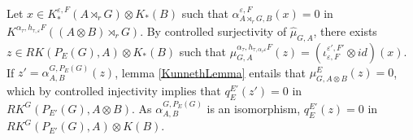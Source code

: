 \begin{dem}
Let $x\in K^{\varepsilon,F}_*(A\rtimes_r G)\otimes K_*(B)$ such that $\alpha_{A\rtimes_r G,B}^{\varepsilon,F}(x)=0$ in $K^{\alpha_\tau,h_{\tau,\varepsilon} F}((A\otimes B)\rtimes_r G)$. By controlled surjectivity of $\hat\mu_{G,A}$, there exists $z\in RK(P_E(G),A)\otimes K_*(B)$ such that $\mu_{G,A}^{\alpha_\tau,h_{\tau,\alpha_\tau\varepsilon} F}(z)=(\iota_{\varepsilon,F}^{\varepsilon',F'}\otimes id) (x)$. If $z' = \alpha_{A,B}^{G,P_E(G)}(z)$, lemma \ref{KunnethLemma} entails that $\mu^{E}_{G,A\otimes B}(z)=0$, which by controlled injectivity implies that $q_E^{E'}(z')=0$ in $RK^G(P_{E'}(G),A\otimes B)$. As $\alpha_{A,B}^{G,P_E(G)}$ is an isomorphism, $q_E^{E'}(z)=0$ in $RK^G(P_{E'}(G),A)\otimes K(B)$.

\end{dem}




























